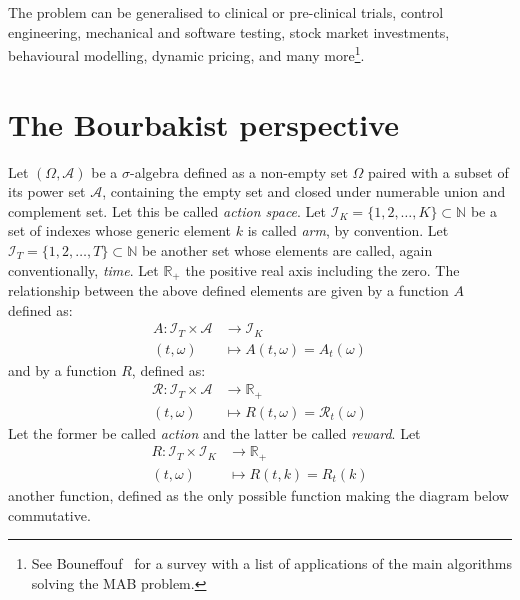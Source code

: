 \documentclass[]{scrartcl}
\begin{document}
The problem can be generalised to clinical or pre-clinical trials, control engineering, mechanical and software testing, stock market investments, behavioural modelling, dynamic pricing, and many more\footnote{See Bouneffouf~\cite{bf2019survey} for a survey with a list of applications of the main algorithms solving the MAB problem.}.

\section{The Bourbakist perspective}
\label{se:bourbaki_perspective}
Let $(\Omega, \mathcal{A})$ be a $\sigma$-algebra defined as a non-empty set $\Omega$ paired with a subset of its power set $\mathcal{A}$, containing the empty set and closed under numerable union and complement set. Let this be called \emph{action space}. Let $\mathcal{I}_{K} = \{1,2, \dots , K\} \subset \mathbb{N}$ be a set of indexes whose generic element $k$ is called \emph{arm}, by convention. Let $\mathcal{I}_{T} = \{1,2, \dots , T\} \subset \mathbb{N}$ be another set whose elements are called, again conventionally, \emph{time}. Let $\mathbb{R}_{+}$ the positive real axis including the zero. The relationship between the above defined elements are given by a function $A$ defined as:
\begin{align*}
    A : \mathcal{I}_T \times \mathcal{A} &\longrightarrow \mathcal{I}_K \\
        (t, \omega) &\longmapsto A(t, \omega) = A_t(\omega)
\end{align*}
and by a function $R$, defined as:
\begin{align*}
\mathcal{R} : \mathcal{I}_T \times \mathcal{A} &\longrightarrow \mathbb{R}_{+} \\
(t, \omega) &\longmapsto R(t, \omega) = \mathcal{R}_t(\omega)
\end{align*}
Let the former be called \emph{action} and the latter be called \emph{reward}. Let 
\begin{align*}
R : \mathcal{I}_T \times \mathcal{I}_K &\longrightarrow \mathbb{R}_{+} \\
(t, \omega) &\longmapsto R(t, k) = R_t(k)
\end{align*}
another function, defined as the only possible function making the diagram below commutative.
\end{document}
